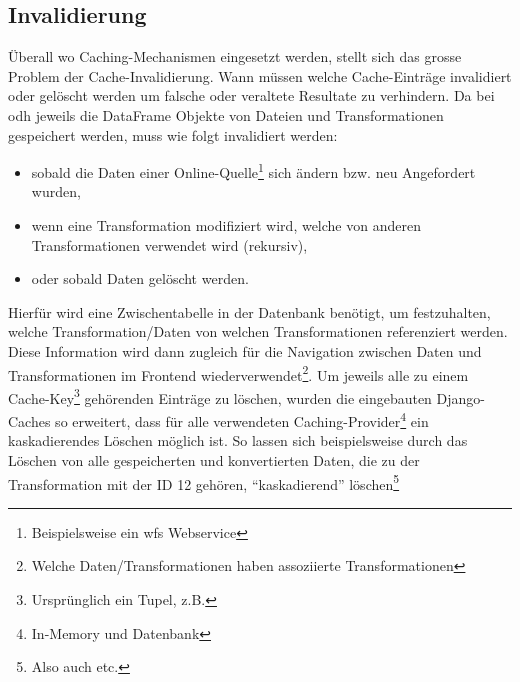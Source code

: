 \subsection{Invalidierung}

Überall wo Caching-Mechanismen eingesetzt werden, stellt sich das grosse Problem der Cache-Invalidierung. Wann müssen welche Cache-Einträge invalidiert oder gelöscht werden um falsche oder veraltete Resultate zu verhindern. Da bei \gls{odh} jeweils die DataFrame Objekte von Dateien und Transformationen gespeichert werden, muss wie folgt invalidiert werden:

\begin{itemize}
	\item sobald die Daten einer Online-Quelle\footnote{Beispielsweise ein \acs{wfs} Webservice} sich ändern bzw. neu Angefordert wurden,
	\item wenn eine Transformation modifiziert wird, welche von anderen Transformationen verwendet wird (rekursiv),
	\item oder sobald Daten gelöscht werden.
\end{itemize}

Hierfür wird eine Zwischentabelle in der Datenbank benötigt, um festzuhalten, welche Transformation/Daten von welchen Transformationen referenziert werden. Diese Information wird dann zugleich für die Navigation zwischen Daten und Transformationen im Frontend wiederverwendet\footnote{Welche Daten/Transformationen haben assoziierte Transformationen}. Um jeweils alle zu einem Cache-Key\footnote{Ursprünglich ein Tupel, z.B. } gehörenden Einträge zu löschen, wurden die eingebauten Django-Caches so erweitert, dass für alle verwendeten Caching-Provider\footnote{In-Memory und Datenbank} ein kaskadierendes Löschen möglich ist. So lassen sich beispielsweise durch das Löschen von  alle gespeicherten und konvertierten Daten, die zu der Transformation mit der ID 12 gehören, ``kaskadierend'' löschen\footnote{Also auch  etc.}
